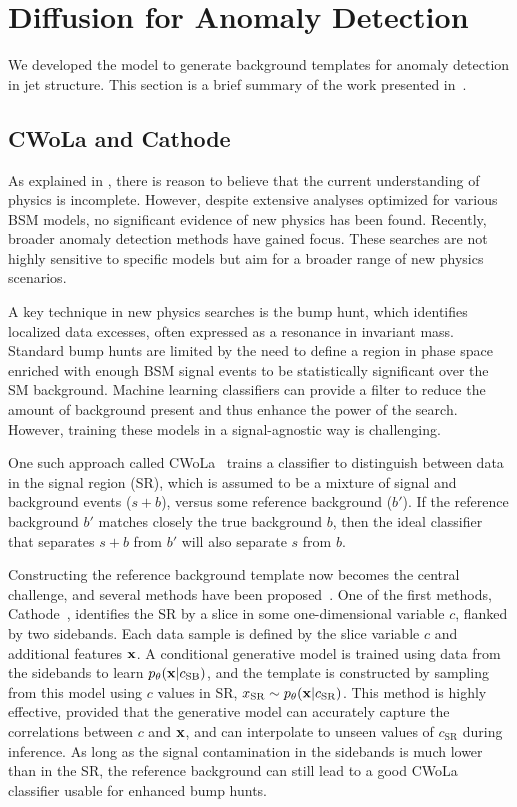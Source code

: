 \FloatBarrier

\section{Diffusion for Anomaly Detection}
\label{sec:drapes}

We developed the \pcdroid model to generate background templates for anomaly detection in jet structure.
This section is a brief summary of the work presented in~\textcite{Drapes}.

\subsection{CWoLa and Cathode}
\label{sec:cwolacathode}

As explained in , there is reason to believe that the current understanding of physics is incomplete.
However, despite extensive analyses optimized for various BSM models, no significant evidence of new physics has been found.
Recently, broader anomaly detection methods have gained focus.
These searches are not highly sensitive to specific models but aim for a broader range of new physics scenarios.

A key technique in new physics searches is the bump hunt, which identifies localized data excesses, often expressed as a resonance in invariant mass.
Standard bump hunts are limited by the need to define a region in phase space enriched with enough BSM signal events to be statistically significant over the SM background.
Machine learning classifiers can provide a filter to reduce the amount of background present and thus enhance the power of the search.
However, training these models in a signal-agnostic way is challenging.

One such approach called CWoLa~\cite{cwola} trains a classifier to distinguish between data in the signal region (SR), which is assumed to be a mixture of signal and background events ($s+b$), versus some reference background ($b'$).
If the reference background $b'$ matches closely the true background $b$, then the ideal classifier that separates $s+b$ from $b'$ will also separate $s$ from $b$.

Constructing the reference background template now becomes the central challenge, and several methods have been proposed~\cite{cathode, salad, CURTAINs, feta, lacathode}.
One of the first methods, Cathode~\cite{cathode}, identifies the SR by a slice in some one-dimensional variable $c$, flanked by two sidebands.
Each data sample is defined by the slice variable $c$ and additional features $\mathbf{x}$.
A conditional generative model is trained using data from the sidebands to learn $p_\theta(\mathbf{x}|c_{\text{SB}})$, and the template is constructed by sampling from this model using $c$ values in SR, $x_{\text{SR}} \sim p_\theta(\mathbf{x}|c_{\text{SR}})$.
This method is highly effective, provided that the generative model can accurately capture the correlations between $c$ and $\mathbf{x}$, and can interpolate to unseen values of $c_\text{SR}$ during inference.
As long as the signal contamination in the sidebands is much lower than in the SR, the reference background can still lead to a good CWoLa classifier usable for enhanced bump hunts.

